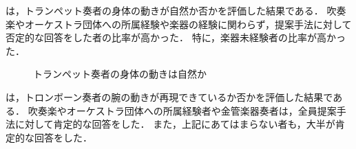 \vspace{5mm}
\par
{}は，トランペット奏者の身体の動きが自然か否かを評価した結果である．
吹奏楽やオーケストラ団体への所属経験や楽器の経験に関わらず，提案手法に対して否定的な回答をした者の比率が高かった．
特に，楽器未経験者の比率が高かった．
\begin{figure}[!h]
	\centering
	\caption{トランペット奏者の身体の動きは自然か}
	\label{fig:Q1-2}
\end{figure}
\newpage
\par
{}は，トロンボーン奏者の腕の動きが再現できているか否かを評価した結果である．
吹奏楽やオーケストラ団体への所属経験者や金管楽器奏者は，全員提案手法に対して肯定的な回答をした．
また，上記にあてはまらない者も，大半が肯定的な回答をした．
